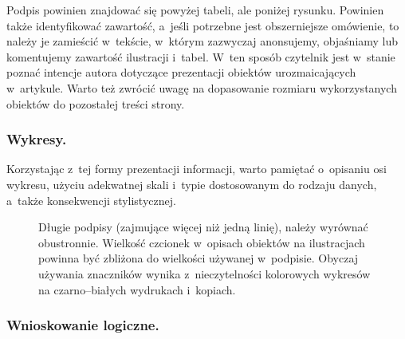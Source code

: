 \noindent Podpis powinien znajdować się powyżej tabeli, ale poniżej rysunku. Powinien także identyfikować zawartość, a~jeśli potrzebne jest obszerniejsze omówienie, to należy je zamieścić w~tekście, w~którym zazwyczaj anonsujemy, objaśniamy lub komentujemy zawartość ilustracji i~tabel. W~ten sposób czytelnik jest w~stanie poznać intencje autora dotyczące prezentacji obiektów urozmaicających w~artykule. Warto też zwrócić uwagę na dopasowanie rozmiaru wykorzystanych obiektów do pozostałej treści strony.

\subsubsection{Wykresy.}
\label{subsubsec:charts}

Korzystając z~tej formy prezentacji informacji, warto pamiętać o~opisaniu osi wykresu, użyciu adekwatnej skali i~typie dostosowanym do rodzaju danych, a~także konsekwencji stylistycznej.

\begin{figure}[!h]
	\centering
	\caption{Długie podpisy (zajmujące więcej niż jedną linię), należy wyrównać obustronnie. Wielkość czcionek w~opisach obiektów na ilustracjach powinna być zbliżona do wielkości używanej w~podpisie. Obyczaj używania znaczników wynika z~nieczytelności kolorowych wykresów na czarno--białych wydrukach i~kopiach.}
	\label{fig:stats}
	\vspace{-20pt}
\end{figure}

\subsubsection{Wnioskowanie logiczne.}
\label{subsubsec:logic}

